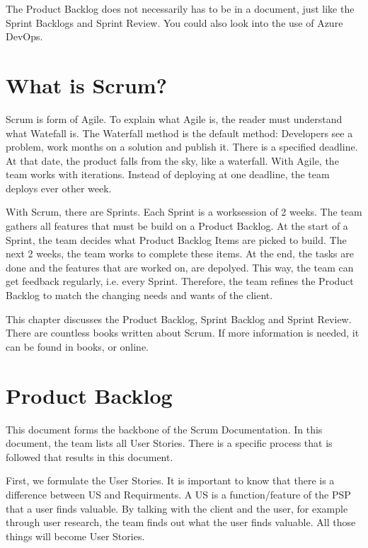 \documentclass[10pt]{report}
\begin{document}
The Product Backlog does not necessarily has to be in a document, just like the Sprint Backlogs and Sprint Review. You could also look into the use of Azure DevOps.

\medskip
\minitoc
\medskip

\newpage

\section{What is Scrum?}

Scrum is form of Agile. To explain what Agile is, the reader must understand what Watefall is. The Waterfall method is the default method: Developers see a problem, work months on a solution and publish it. There is a specified deadline. At that date, the product falls from the sky, like a waterfall. With Agile, the team works with iterations. Instead of deploying at one deadline, the team deploys ever other week. 

\bigskip

With Scrum, there are Sprints. Each Sprint is a worksession of 2 weeks. The team gathers all features that must be build on a Product Backlog. At the start of a Sprint, the team decides what Product Backlog Items are picked to build. The next 2 weeks, the team works to complete these items. At the end, the tasks are done and the features that are worked on, are depolyed. This way, the team can get feedback regularly, i.e. every Sprint. Therefore, the team refines the Product Backlog to match the changing needs and wants of the client.

\bigskip

This chapter discusses the Product Backlog, Sprint Backlog and Sprint Review. 
There are countless books written about Scrum. If more information is needed, it can be found in books, or online.

\newpage

\section{Product Backlog}


This document forms the backbone of the Scrum Documentation. In this document, the team lists all User Stories. There is a specific process that is followed that results in this document.

First, we formulate the User Stories. It is important to know that there is a difference between US and Requirments. A US is a function/feature of the PSP that a user finds valuable. By talking with the client and the user, for example through user research, the team finds out what the user finds valuable. All those things will become User Stories.
\end{document}

